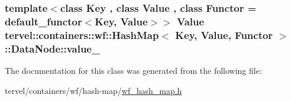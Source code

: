 \subsubsection[{value\+\_\+}]{\setlength{\rightskip}{0pt plus 5cm}template$<$class Key , class Value , class Functor  = default\+\_\+functor$<$\+Key, Value$>$$>$ {\bf Value} {\bf tervel\+::containers\+::wf\+::\+Hash\+Map}$<$ Key, {\bf Value}, Functor $>$\+::Data\+Node\+::value\+\_\+}\label{classtervel_1_1containers_1_1wf_1_1_hash_map_1_1_data_node_a92498a88201109a8cababeff699435a6}


The documentation for this class was generated from the following file\+:\begin{DoxyCompactItemize}
\item 
tervel/containers/wf/hash-\/map/\hyperlink{wf__hash__map_8h}{wf\+\_\+hash\+\_\+map.\+h}\end{DoxyCompactItemize}
